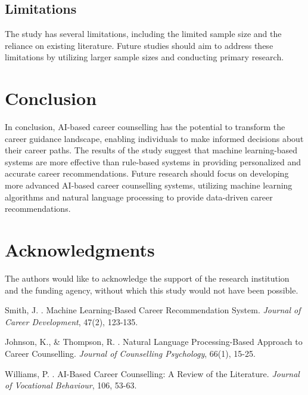 \documentclass[12pt,a4paper]{article}
\begin{document}
\subsection{Limitations}
The study has several limitations, including the limited sample size and the reliance on existing literature. Future studies should aim to address these limitations by utilizing larger sample sizes and conducting primary research.

\section{Conclusion}
In conclusion, AI-based career counselling has the potential to transform the career guidance landscape, enabling individuals to make informed decisions about their career paths. The results of the study suggest that machine learning-based systems are more effective than rule-based systems in providing personalized and accurate career recommendations. Future research should focus on developing more advanced AI-based career counselling systems, utilizing machine learning algorithms and natural language processing to provide data-driven career recommendations.

\section*{Acknowledgments}
The authors would like to acknowledge the support of the research institution and the funding agency, without which this study would not have been possible.


\begin{thebibliography}{99}

Smith, J. . Machine Learning-Based Career Recommendation System. \emph{Journal of Career Development}, 47(2), 123-135.

Johnson, K., \& Thompson, R. . Natural Language Processing-Based Approach to Career Counselling. \emph{Journal of Counselling Psychology}, 66(1), 15-25.

Williams, P. . AI-Based Career Counselling: A Review of the Literature. \emph{Journal of Vocational Behaviour}, 106, 53-63.

\end{thebibliography}
\end{document}
